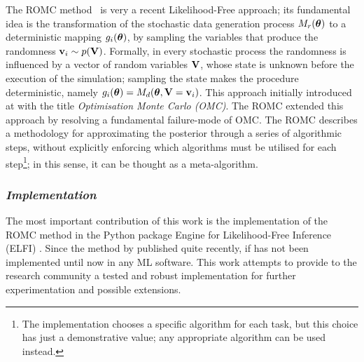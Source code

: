 The ROMC method~\autocite{Ikonomov2019} is very a recent
Likelihood-Free approach; its fundamental idea is the transformation
of the stochastic data generation process $M_r(\boldsymbol{\theta})$ to a
deterministic mapping $g_i(\boldsymbol{\theta})$, by sampling the variables that
produce the randomness $\mathbf{v}_i \sim p(\mathbf{V})$. Formally, in every
stochastic process the randomness is influenced by a vector of random
variables $\mathbf{V}$, whose state is unknown before the execution of the
simulation; sampling the state makes the procedure deterministic,
namely $g_i(\boldsymbol{\theta}) = M_d(\boldsymbol{\theta}, \mathbf{V}=\mathbf{v}_i)$. This approach
initially introduced at \autocite{Meeds2015} with the title
\textit{Optimisation Monte Carlo (OMC)}. The ROMC extended this
approach by resolving a fundamental failure-mode of OMC\@. The ROMC
describes a methodology for approximating the posterior through a
series of algorithmic steps, without explicitly enforcing which
algorithms must be utilised for each step\footnote{The implementation
  chooses a specific algorithm for each task, but this choice has just
  a demonstrative value; any appropriate algorithm can be used
  instead.}; in this sense, it can be thought as a meta-algorithm.

\subsubsection*{\textit{Implementation}}

The most important contribution of this work is the implementation of
the ROMC method in the Python package Engine for Likelihood-Free
Inference (ELFI) \autocite{1708.00707}. Since the method by published quite recently, if has not been implemented until now in any ML software. This work attempts to provide to the research community a
tested and robust implementation for further experimentation and
possible extensions.
